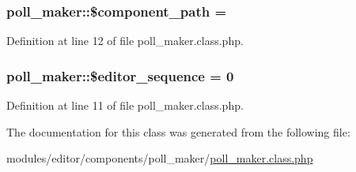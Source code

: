 \subsubsection[{\texorpdfstring{\$component\+\_\+path}{$component_path}}]{\setlength{\rightskip}{0pt plus 5cm}poll\+\_\+maker\+::\$component\+\_\+path = \textquotesingle{}\textquotesingle{}}\hypertarget{classpoll__maker_aed45da13a32668475091fceb3a3e526d}{}\label{classpoll__maker_aed45da13a32668475091fceb3a3e526d}


Definition at line 12 of file poll\+\_\+maker.\+class.\+php.

\subsubsection[{\texorpdfstring{\$editor\+\_\+sequence}{$editor_sequence}}]{\setlength{\rightskip}{0pt plus 5cm}poll\+\_\+maker\+::\$editor\+\_\+sequence = 0}\hypertarget{classpoll__maker_a17d99b5a9fe1df8e90cc572590e8a5e6}{}\label{classpoll__maker_a17d99b5a9fe1df8e90cc572590e8a5e6}


Definition at line 11 of file poll\+\_\+maker.\+class.\+php.



The documentation for this class was generated from the following file\+:\begin{DoxyCompactItemize}
\item 
modules/editor/components/poll\+\_\+maker/\hyperlink{poll__maker_8class_8php}{poll\+\_\+maker.\+class.\+php}\end{DoxyCompactItemize}
